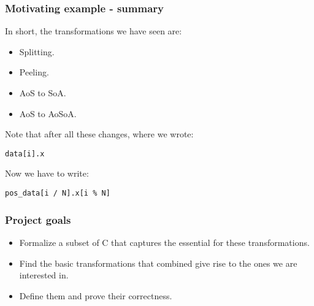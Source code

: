 \begin{frame}[fragile]
\frametitle{Motivating example - summary}

In short, the transformations we have seen are:
\begin{itemize}
	\item Splitting.
	\item Peeling.
	\item AoS to SoA.
	\item AoS to AoSoA.
\end{itemize}

\bigskip

Note that after all these changes, where we wrote:

\begin{lstlisting}[style=Cstyle]
  data[i].x 
\end{lstlisting}

Now we have to write:

\begin{lstlisting}[style=Cstyle]
  pos_data[i / N].x[i % N]
\end{lstlisting}

\end{frame}

\begin{frame}[fragile]
\frametitle{Project goals}

\begin{itemize}
	\setlength\itemsep{1.5em}
	\item Formalize a subset of C that captures the essential for these transformations.\\
	\item Find the basic transformations that combined give rise to the ones we are interested in.\\
	\item Define them and prove their correctness.
\end{itemize}

\end{frame}


